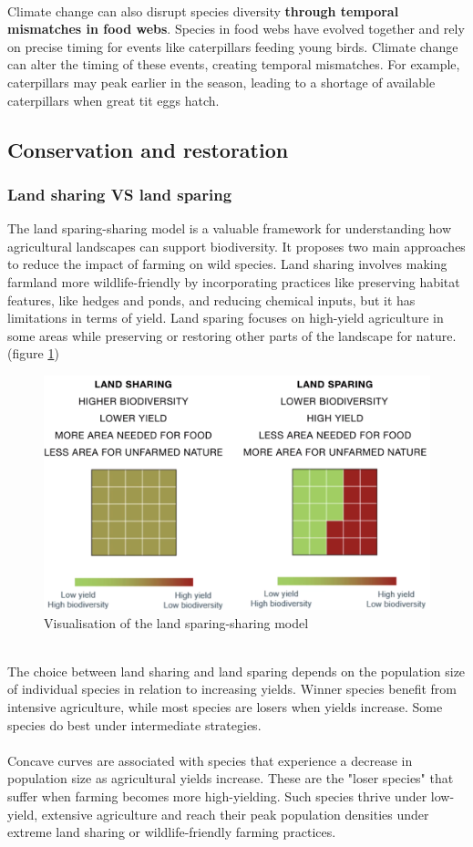 \documentclass[../summary.tex]{subfiles}
\begin{document}
\ \\
Climate change can also disrupt species diversity \textbf{through temporal mismatches in food webs}. Species in food webs have evolved together and rely on precise timing for events like caterpillars feeding young birds. Climate change can alter the timing of these events, creating temporal mismatches. For example, caterpillars may peak earlier in the season, leading to a shortage of available caterpillars when great tit eggs hatch.
\newpage

\subsection{Conservation and restoration}
\subsubsection{Land sharing VS land sparing}

The land sparing-sharing model is a valuable framework for understanding how agricultural landscapes can support biodiversity. It proposes two main approaches to reduce the impact of farming on wild species. Land sharing involves making farmland more wildlife-friendly by incorporating practices like preserving habitat features, like hedges and ponds, and reducing chemical inputs, but it has limitations in terms of yield. Land sparing focuses on high-yield agriculture in some areas while preserving or restoring other parts of the landscape for nature. (figure \ref{fig:sparingsharingmodel})

\begin{figure}[H]
	\centering
	\includegraphics[width=0.7\linewidth]{../images/sparing_sharing_model}
	\caption{Visualisation of the land sparing-sharing model}
	\label{fig:sparingsharingmodel}
\end{figure}

\ \\
The choice between land sharing and land sparing depends on the population size of individual species in relation to increasing yields. Winner species benefit from intensive agriculture, while most species are losers when yields increase. Some species do best under intermediate strategies. \\
\\
Concave curves are associated with species that experience a decrease in population size as agricultural yields increase. These are the "loser species" that suffer when farming becomes more high-yielding. Such species thrive under low-yield, extensive agriculture and reach their peak population densities under extreme land sharing or wildlife-friendly farming practices.
\end{document}
